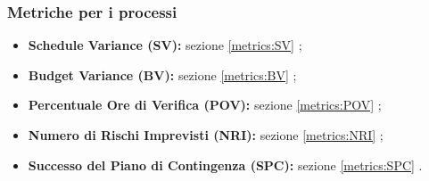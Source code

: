 \subsubsection{Metriche per i processi}
\begin{itemize}
	\item \textbf{Schedule Variance (SV):} sezione \ref{metrics:SV} ;
	\item \textbf{Budget Variance (BV):} sezione \ref{metrics:BV} ;
	\item \textbf{Percentuale Ore di Verifica (POV):} sezione \ref{metrics:POV} ;
	\item \textbf{Numero di Rischi Imprevisti (NRI):} sezione \ref{metrics:NRI} ;
	\item \textbf{Successo del Piano di Contingenza (SPC):} sezione \ref{metrics:SPC} .
\end{itemize}

